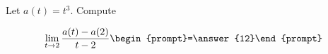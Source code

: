 \documentclass{ximera}
\author{Bart Snapp}
\begin{document}
\begin{exercise}
Let $a(t) = t^3$. Compute

\[
\lim_{ t\to 2 } 
\frac{a(t)-a(2)}{t-2} \begin{prompt}=\answer{12}\end{prompt}
\]
\end{exercise}
\end{document}
